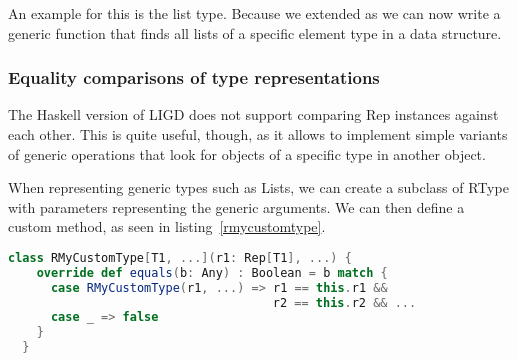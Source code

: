 An example for this is the list type. Because we extended  as
 we can now write a generic function that finds all lists of a
specific element type in a data structure.

\subsubsection{Equality comparisons of type representations}
The Haskell version of LIGD does not support comparing Rep instances
against each other. This is quite useful, though, as it allows to
implement simple variants of generic operations that look for objects
of a specific type in another object.


When representing generic types such as Lists, we can create a subclass
of RType with parameters representing the generic arguments. We can then
define a custom  method, as seen in listing~\ref{rmycustomtype}.

\begin{lstlisting}[language=Scala,gobble=2,float,caption=Representing custom generic types,label=rmycustomtype]
  class RMyCustomType[T1, ...](r1: Rep[T1], ...) {
    override def equals(b: Any) : Boolean = b match {
      case RMyCustomType(r1, ...) => r1 == this.r1 &&
                                     r2 == this.r2 && ...
      case _ => false
    }
  }
\end{lstlisting}
